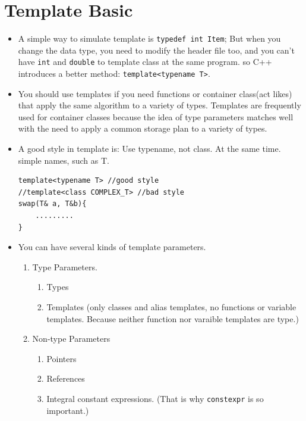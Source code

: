 \documentclass[a4paper,11pt,twoside]{book}
\begin{document}
\section{Template Basic}
\begin{itemize}
    \item A simple way to simulate template is \verb=typedef int Item=; But when you change the data type, you need to modify the header file too, and you can't have \texttt{int} and \texttt{double} to template class at the same program. so C++ introduces a better method: \texttt{template<typename T>}.

    \item You should use templates if you need functions or container class(act likes) that apply the same algorithm to a variety of types. Templates are frequently used for container classes because the idea of type parameters matches well with the need to apply a common storage plan to a variety of types.

    \item A good style in template is: Use typename, not class. At the same time. simple names, such as T.
\begin{lstlisting}[numbers=none]
template<typename T> //good style
//template<class COMPLEX_T> //bad style
swap(T& a, T&b){
	.........
}
\end{lstlisting}
    \item You can have several kinds of template parameters.
\begin{enumerate}
    \item  Type Parameters.
  	\begin{enumerate}
   	\item Types
    \item Templates (only classes and alias templates, no functions or variable templates. Because neither function nor varaible templates are type.)
	\end{enumerate}

\item Non-type Parameters
   \begin{enumerate}
	\item Pointers
	\item References
	\item Integral constant expressions. (That is why \texttt{constexpr} is so important.)
	\end{enumerate}
\end{enumerate}

\end{itemize}
\end{document}
